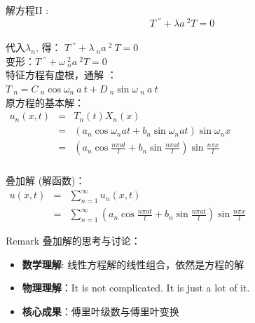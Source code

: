 \begin{frame}
	\frametitle{}	
	解方程II : 	\[ T~^{''} +\lambda {a~^2 T}=0 \] \\ 
	代入$\lambda_n$, 得：
	$\displaystyle  T~^{''} +\lambda~_n a~^2 ~T=0 $ \\
	变形：$\displaystyle  T~^{''} +\omega ~_n ^2 {a~^2 T}=0 $ \\ 
	特征方程有虚根，通解 ：\\
	\hspace{3cm}	$\displaystyle 	T~_n=C~_n\cos \omega_n~a~t+ D~_n\sin \omega ~_n~a~t $  \\ \vspace{1em}
	原方程的基本解：\\
	$\begin{array}{llll}
		u_n(x,t) &=& T_n(t)X_n(x)\\
		&=& (a_n\cos \omega_nat+ b_n\sin \omega _nat ) \sin \omega_n x\\
		&=&(a_n\cos\frac{ n\pi at}{l}+ b_n\sin \frac{ n\pi at}{l}) \sin \frac{ n\pi x}{l}
	\end{array}$ \\ 
\end{frame}	

\begin{frame}
	\frametitle{}	
	叠加解 (解函数)：\\
	$\begin{array}{llll}
		u(x,t) &=&\sum\limits_{n=1}^{\infty } u_n(x,t)\\
		&=& \sum\limits_{n=1}^{\infty }  (a_n\cos\frac{ n\pi at}{l}+ b_n\sin \frac{ n\pi at}{l}) \sin \frac{ n\pi x}{l}
	\end{array}$ \\ \vspace{1em}

	\begin{block} {Remark } 
		叠加解的思考与讨论：
		\begin{itemize}
			\item \textbf {数学理解}: 线性方程解的线性组合，依然是方程的解  
			\item \textbf {物理理解}：It is not complicated. It is just a lot of it. 
			\item \textbf {核心成果}：傅里叶级数与傅里叶变换 
		\end{itemize}
	\end{block}
\end{frame}	

